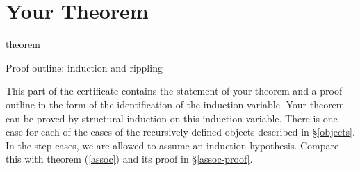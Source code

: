 \documentclass[twocolumn]{article}
\begin{document}
\section{Your Theorem}
\label{theorem}

{{{theorem}}}

\begin{center}
Proof outline: induction and rippling
\end{center}

This part of the certificate contains the statement of your theorem and a proof
outline in the form of the identification of the induction variable.  Your
theorem can be proved by structural induction on this induction variable. There
is one case for each of the cases of the recursively defined objects described
in \S\ref{objects}. In the step cases, we are allowed to assume an induction
hypothesis. Compare this with theorem (\ref{assoc}) and its proof in
\S\ref{assoc-proof}.
\end{document}
